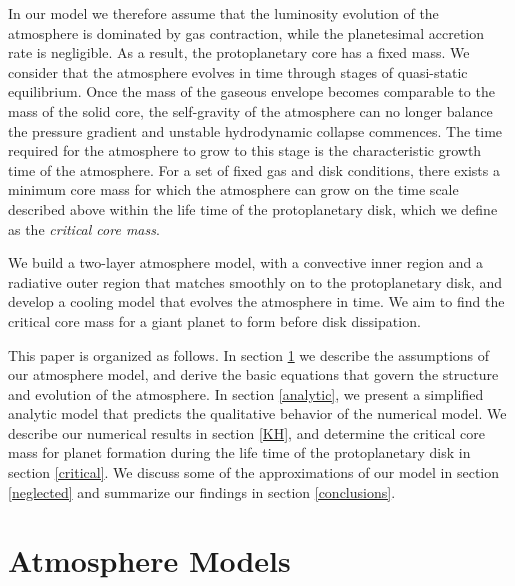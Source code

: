 \documentclass[apj]{emulateapj}
\begin{document}
In our model we therefore assume that the luminosity evolution of the atmosphere is dominated by gas contraction, while the planetesimal accretion rate is negligible. As a result, the protoplanetary core has a fixed mass. We consider that the atmosphere evolves in time through stages of quasi-static equilibrium. Once the mass of the gaseous envelope becomes comparable to the mass of the solid core, the self-gravity of the atmosphere can no longer balance the pressure gradient and unstable hydrodynamic collapse commences. The time required for the atmosphere to grow to this stage is the characteristic growth time of the atmosphere. For a set of fixed gas and disk conditions, there exists a minimum core mass for which the atmosphere can grow on the time scale described above within the life time of the protoplanetary disk, which we define as the \textit{critical core mass}. 

We build a two-layer atmosphere model, with a convective inner region and a radiative outer region that matches smoothly on to the protoplanetary disk, and develop a cooling model that evolves the atmosphere in time. We aim to find the critical core mass for a giant planet to form before disk dissipation.

This paper is organized as follows. In section \ref{sec2} we describe the assumptions of our atmosphere model, and derive the basic equations that govern the structure and evolution of the atmosphere. In section \ref{analytic}, we present a simplified analytic model that predicts the qualitative behavior of the numerical model. We describe our numerical results in section \ref{KH}, and determine the critical core mass for planet formation during the life time of the protoplanetary disk in section \ref{critical}.  We discuss some of the approximations of our model in section \ref{neglected} and summarize our findings in section \ref{conclusions}.





\section{Atmosphere Models}
\label{sec2}
\end{document}
